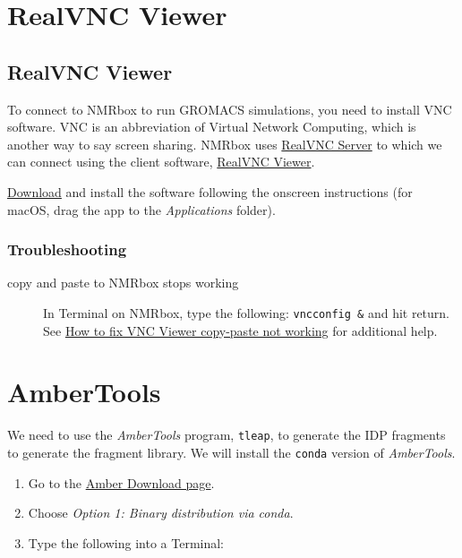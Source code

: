 \documentclass[
  letterpaper,
  DIV=11,
  numbers=noendperiod]{scrreprt}
\providecommand{\tightlist}{%
  \setlength{\itemsep}{0pt}\setlength{\parskip}{0pt}}\usepackage{longtable,booktabs,array}
\begin{document}
\section{RealVNC Viewer}\label{realvnc-viewer}

\subsection{RealVNC Viewer}\label{realvnc-viewer-1}

To connect to NMRbox to run GROMACS simulations, you need to install VNC
software. VNC is an abbreviation of Virtual Network Computing, which is
another way to say screen sharing. NMRbox uses
\href{https://www.realvnc.com/en/connect/download/vnc/}{RealVNC Server}
to which we can connect using the client software,
\href{https://www.realvnc.com/en/connect/download/viewer/}{RealVNC
Viewer}.

\href{https://www.realvnc.com/en/connect/download/viewer/}{Download} and
install the software following the onscreen instructions (for macOS,
drag the app to the \emph{Applications} folder).

\subsubsection{Troubleshooting}\label{troubleshooting}

\begin{description}
\item[copy and paste to NMRbox stops working]
In Terminal on NMRbox, type the following: \texttt{vncconfig\ \&} and
hit return. See
\href{https://www.anyviewer.com/how-to/vnc-viewer-copy-paste-2578.html}{How
to fix VNC Viewer copy-paste not working} for additional help.
\end{description}

\section{AmberTools}\label{ambertools}

We need to use the \emph{AmberTools} program, \texttt{tleap}, to
generate the IDP fragments to generate the fragment library. We will
install the \texttt{conda} version of \emph{AmberTools}.

\begin{enumerate}
\def\labelenumi{\arabic{enumi}.}
\tightlist
\item
  Go to the \href{https://ambermd.org/GetAmber.php}{Amber Download
  page}.
\item
  Choose \emph{Option 1: Binary distribution via conda}.
\item
  Type the following into a Terminal:
\end{enumerate}
\end{document}

